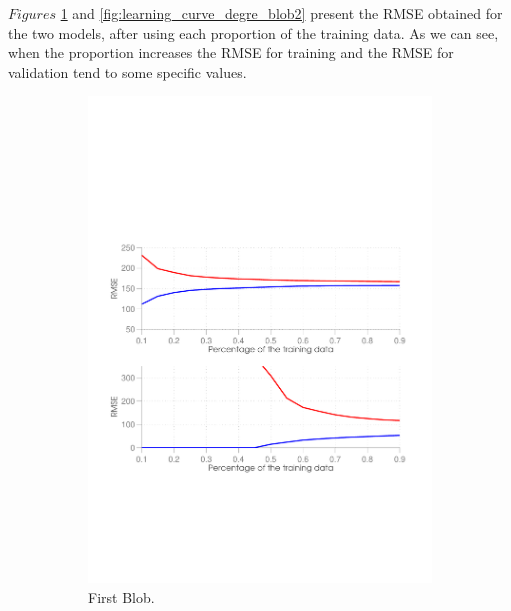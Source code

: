 $Figures$ \ref{fig:learning_curve_degree_blob1} and \ref{fig:learning_curve_degre_blob2} present the RMSE obtained for the two models, after using each proportion of the training data. As we can see, when the proportion increases the RMSE for training and the RMSE for validation tend to some specific values.

\begin{figure}[ht]
  \centering
  \begin{subfigure}[b]{0.48\textwidth}
   \includegraphics[clip, trim=0cm 7.8cm 0cm 0cm, width=\textwidth]{figures/learning_curve.pdf}
    \caption{First Blob. }
    \label{fig:learning_curve_degree_blob1}
  \end{subfigure}
  \hfill
  \begin{subfigure}[b]{0.48\textwidth}

\end{subfigure}
\end{figure}
